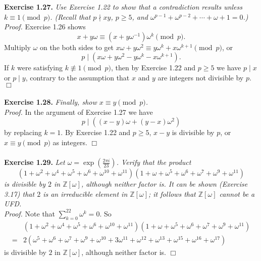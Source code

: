 \documentclass{article}
\begin{document}



\textbf{Exercise 1.27.}
\emph{Use Exercise 1.22 to show that a contradiction results unless $k \equiv 1 \pmod{p}$.
(Recall that $p \nmid xy$, $p \geq 5$, and
$\omega^{p-1} + \omega^{p-2} + \cdots + \omega + 1 = 0$.) } \\

\emph{Proof.}
Exercise 1.26 shows
$$x + y\omega \equiv (x + y\omega^{-1}) \omega^k \pmod{p}.$$
Multiply $\omega$ on the both sides to get
$x\omega + y\omega^2 \equiv y\omega^{k} + x\omega^{k+1} \pmod{p}$, or
$$p \mid (x\omega + y\omega^2 - y\omega^{k} - x\omega^{k+1}).$$
If $k$ were satisfying $k \not\equiv 1 \pmod{p}$, then by Exercise 1.22 and $p \geq 5$
we have $p \mid x$ or $p \mid y$, contrary to the assumption that
$x$ and $y$ are integers not divisible by $p$.
$\Box$ \\\\






\textbf{Exercise 1.28.}
\emph{Finally, show $x \equiv y \pmod{p}$.} \\

\emph{Proof.}
In the argument of Exercise 1.27 we have
$$p \mid ((x-y)\omega + (y-x)\omega^2)$$
by replacing $k = 1$.
By Exercise 1.22 and $p \geq 5$, $x - y$ is divisible by $p$,
or $x \equiv y \pmod{p}$ as integers.
$\Box$ \\\\






\textbf{Exercise 1.29.}
\emph{Let $\omega = \exp(\frac{2\pi i}{23})$.
Verify that the product
$$(1+\omega^2+\omega^4+\omega^5+\omega^6+\omega^{10}+\omega^{11})
(1+\omega+\omega^5+\omega^6+\omega^7+\omega^9+\omega^{11})$$
is divisible by $2$ in $\mathbb{Z}[\omega]$,
although neither factor is.
It can be shown (Exercise 3.17) that $2$ is an irreducible element in $\mathbb{Z}[\omega]$;
it follows that $\mathbb{Z}[\omega]$ cannot be a UFD. } \\

\emph{Proof.}
Note that $\sum_{k=0}^{22} \omega^k = 0$.
So
\begin{align*}
&(1+\omega^2+\omega^4+\omega^5+\omega^6+\omega^{10}+\omega^{11})
(1+\omega+\omega^5+\omega^6+\omega^7+\omega^9+\omega^{11}) \\
=& 2(\omega^5+\omega^6+\omega^7+\omega^9+\omega^{10}+3\omega^{11}
+\omega^{12}+\omega^{13}+\omega^{15}+\omega^{16}+\omega^{17})
\end{align*}
is divisible by $2$ in $\mathbb{Z}[\omega]$,
although neither factor is.
$\Box$ \\\\
\end{document}

